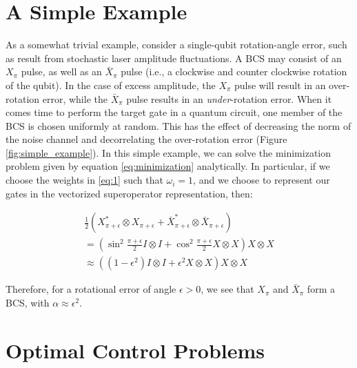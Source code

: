 \documentclass[aps,nofootinbib,pra,notitlepage,twocolumn]{revtex4-1}
\begin{document}
\section{A Simple Example}
As a somewhat trivial example, consider a single-qubit rotation-angle error, such as result from stochastic laser amplitude fluctuations. A BCS may consist of an $X_\pi$ pulse, as well as an $\bar X_\pi$ pulse (i.e., a clockwise and counter clockwise rotation of the qubit). In the case of excess amplitude, the $X_\pi$ pulse will result in an over-rotation error, while the $\bar X_\pi$ pulse results in an \emph{under}-rotation error. When it comes time to perform the target gate in a quantum circuit, one member of the BCS is chosen uniformly at random. This has the effect of decreasing the norm of the noise channel and decorrelating the over-rotation error (Figure \ref{fig:simple_example}). In this simple example, we can solve the minimization problem given by equation \ref{eq:minimization} analytically. In particular, if we choose the weights in \ref{eq:1} such that $\omega_i=1$, and we choose to represent our gates in the vectorized superoperator representation, then:

\begin{equation}
  \begin{gathered}
    \frac{1}{2}(X^*_{\pi + \epsilon}\otimes X_{\pi + \epsilon} + \bar X^*_{\pi + \epsilon}\otimes \bar X_{\pi + \epsilon}) \\
    = (\sin^2{\frac{\pi + \epsilon}{2}}I\otimes I + \cos^2{\frac{\pi + \epsilon}{2}}X\otimes X)X\otimes X \\
    \approx ((1 - \epsilon^2)I\otimes I + \epsilon^2X\otimes X)X\otimes X
  \end{gathered}
\end{equation}

Therefore, for a rotational error of angle $\epsilon > 0$, we see that $X_\pi$ and  $\bar X_\pi$  form a BCS, with $\alpha\approx\epsilon^2$.



\section{Optimal Control Problems}\label{ocp}
\end{document}
